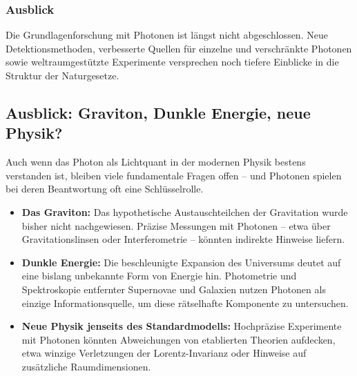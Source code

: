 \subsubsection{Ausblick}

Die Grundlagenforschung mit Photonen ist längst nicht abgeschlossen. 
Neue Detektionsmethoden, verbesserte Quellen für einzelne und verschränkte Photonen sowie weltraumgestützte Experimente versprechen noch tiefere Einblicke in die Struktur der Naturgesetze.
\newpage
\noindent
\subsection{Ausblick: Graviton, Dunkle Energie, neue \newline Physik?}

Auch wenn das Photon als Lichtquant in der modernen Physik bestens verstanden ist, bleiben viele fundamentale Fragen offen – und Photonen spielen bei deren Beantwortung oft eine Schlüsselrolle.

\begin{itemize}
	\item \textbf{Das Graviton:} Das hypothetische Austauschteilchen der Gravitation wurde bisher nicht nachgewiesen. 
	Präzise Messungen mit Photonen – etwa über Gravitationslinsen oder Interferometrie – könnten indirekte Hinweise liefern.
	\item \textbf{Dunkle Energie:} Die beschleunigte Expansion des Universums deutet auf eine bislang unbekannte Form von Energie hin. 
	Photometrie und Spektroskopie entfernter Supernovae und Galaxien nutzen Photonen als einzige Informationsquelle, um diese rätselhafte Komponente zu untersuchen.
	\item \textbf{Neue Physik jenseits des Standardmodells:} Hochpräzise Experimente mit Photonen könnten Abweichungen von etablierten Theorien aufdecken, etwa winzige Verletzungen der Lorentz-Invarianz oder Hinweise auf zusätzliche Raumdimensionen.
\end{itemize}

